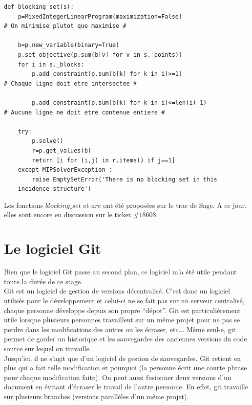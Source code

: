 \documentclass[a4paper]{article}
\begin{document}
\begin{lstlisting}
def blocking_set(s):
    p=MixedIntegerLinearProgram(maximization=False)
# On minimise plutot que maximise #

    b=p.new_variable(binary=True)
    p.set_objective(p.sum(b[v] for v in s._points))
    for i in s._blocks:
        p.add_constraint(p.sum(b[k] for k in i)>=1)
# Chaque ligne doit etre intersectee #

        p.add_constraint(p.sum(b[k] for k in i)<=len(i)-1)
# Aucune ligne ne doit etre contenue entiere #
        
    try:
        p.solve()
        r=p.get_values(b)
        return [i for (i,j) in r.items() if j==1]
    except MIPSolverException :
        raise EmptySetError('There is no blocking set in this
    incidence structure')  
\end{lstlisting}
\vspace{1\baselineskip}
Les fonctions $blocking\_set$ et $arc$ ont été proposées sur le trac de Sage. A ce jour, elles sont encore en discussion sur le ticket $\#18608$.
\newpage
\section*{Le logiciel Git}
Bien que le logiciel Git passe au second plan, ce logiciel m'a été utile pendant toute la durée de ce stage.\\
Git est un logiciel de gestion de versions décentralisé. C'est donc un logiciel utilisés pour le développement et celui-ci ne se fait pas sur un serveur centralisé, chaque personne développe depuis son propre ``dépot''. Git est particulièrement utile lorsque plusieurs personnes travaillent sur un même projet pour ne pas se perdre dans les modifications des autres ou les écraser, etc... Même seul-e, git permet de garder un historique et les sauvegardes des anciennes versions du code source sur lequel on travaille.\\
Jusqu'ici, il ne s'agit que d'un logiciel de gestion de sauvegardes. Git retient en plus qui a fait telle modification et pourquoi (la personne écrit une courte phrase pour chaque modification faite). On peut aussi fusionner deux versions d'un document en évitant d'écraser le travail de l'autre personne. En effet, git travaille sur plusieurs branches (versions parallèles d'un même projet).
\end{document}

